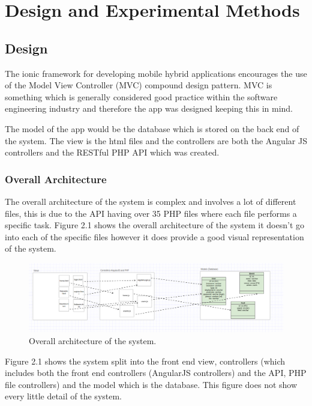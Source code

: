 \chapter{Design and Experimental Methods}
\section{Design}
The ionic framework for developing mobile hybrid applications encourages the use of the Model View Controller (MVC) compound design pattern. MVC is something which is generally considered good practice within the software engineering industry \cite{hybridcrap} and therefore the app was designed keeping this in mind.

The model of the app would be the database which is stored on the back end of the system. The view is the html files and the controllers are both the Angular JS controllers and the RESTful PHP API which was created.

\subsection{Overall Architecture}
The overall architecture of the system is complex and involves a lot of different files, this is due to the API having over 35 PHP files where each file performs a specific task. Figure 2.1 shows the overall architecture of the system it doesn't go into each of the specific files however it does provide a good visual representation of the system.

\begin{center} 
\begin{figure}[H]
\includegraphics[width=\textwidth,height=\textheight,keepaspectratio]{images/overall}
\caption{Overall architecture of the system.}
\end{figure}
\end{center}

Figure 2.1 shows the system split into the front end view, controllers (which includes both the front end controllers (AngularJS controllers) and the API, PHP file controllers) and the model which is the database. This figure does not show every little detail of the system.

